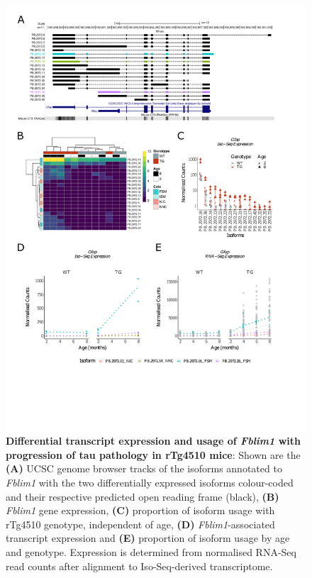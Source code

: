 \begin{figure}[!htp]
	\centering
	\includegraphics[page=6,trim={1.5cm 3cm 2cm 1cm}, scale = 0.80]{Figures/Ch5_DiffPlots.pdf}
	\captionsetup{width=0.95\textwidth}
	\caption[Differential \textit{Fblim1} transcript expression and usage]%
	{\textbf{Differential transcript expression and usage of \textit{Fblim1} with progression of tau pathology in rTg4510 mice}: Shown are the \textbf{(A)} UCSC genome browser tracks of the isoforms annotated to \textit{Fblim1} with the two differentially expressed isoforms colour-coded and their respective predicted open reading frame (black), \textbf{(B)} \textit{Fblim1} gene expression, \textbf{(C)} proportion of isoform usage with rTg4510 genotype, independent of age, \textbf{(D)} \textit{Fblim1}-associated transcript expression and \textbf{(E)} proportion of isoform usage by age and genotype. Expression is determined from normalised RNA-Seq read counts after alignment to Iso-Seq-derived transcriptome.} 
	\label{fig:DIU_fblim1}
\end{figure}

